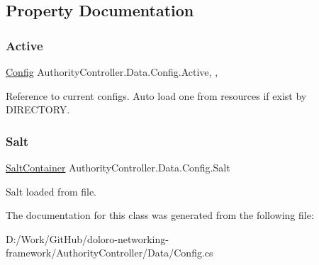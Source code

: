 \subsection{Property Documentation}
\mbox{\label{class_authority_controller_1_1_data_1_1_config_a0cf8083d60c0876a83ecb79e32fc9ffc}} 
\subsubsection{\texorpdfstring{Active}{Active}}
{\footnotesize\ttfamily \mbox{\hyperlink{class_authority_controller_1_1_data_1_1_config}{Config}} Authority\+Controller.\+Data.\+Config.\+Active\hspace{0.3cm}{\ttfamily [static]}, {\ttfamily [get]}, {\ttfamily [set]}}



Reference to current configs. Auto load one from resources if exist by D\+I\+R\+E\+C\+T\+O\+RY. 

\mbox{\label{class_authority_controller_1_1_data_1_1_config_ad40500f15f27c829f86295c7cd40d68c}} 
\subsubsection{\texorpdfstring{Salt}{Salt}}
{\footnotesize\ttfamily \mbox{\hyperlink{class_authority_controller_1_1_data_1_1_salt_container}{Salt\+Container}} Authority\+Controller.\+Data.\+Config.\+Salt\hspace{0.3cm}{\ttfamily [get]}}



Salt loaded from file. 



The documentation for this class was generated from the following file\+:\begin{DoxyCompactItemize}
\item 
D\+:/\+Work/\+Git\+Hub/doloro-\/networking-\/framework/\+Authority\+Controller/\+Data/Config.\+cs\end{DoxyCompactItemize}
